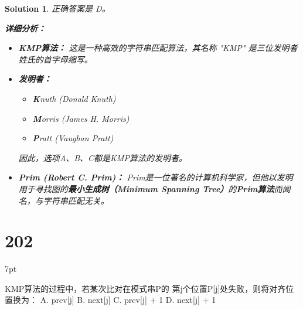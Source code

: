 \documentclass[UTF8]{report}
\newtheorem{solution}{Solution}
\theoremstyle{MyLineTheoremStyle} %
\theoremstyle{MyBlockTheoremStyle} %
\theoremstyle{MySubsubsectionStyle} %
\newenvironment{graybox}{%
        \def\FrameCommand{%
        \hspace{1pt}%
        {\color{gray}\small \vrule width 2pt}%
        {\color{graybox_color}\vrule width 4pt}%
        \colorbox{graybox_color}%
        }%
        \MakeFramed{\advance\hsize-\width\FrameRestore}%
        \noindent\hspace{-4.55pt}%
        \begin{adjustwidth}{}{7pt}%
        \vspace{2pt}\vspace{2pt}%
        }
        {%
        \vspace{2pt}\end{adjustwidth}\endMakeFramed%
        }
\begin{document}
\begin{solution}
正确答案是 D。

\textbf{详细分析：}

\begin{itemize}
    \item \textbf{KMP算法：} 这是一种高效的字符串匹配算法，其名称 "KMP" 是三位发明者姓氏的首字母缩写。
    \item \textbf{发明者：}
    \begin{itemize}
        \item \textbf{K}nuth (Donald Knuth)
        \item \textbf{M}orris (James H. Morris)
        \item \textbf{P}ratt (Vaughan Pratt)
    \end{itemize}
    因此，选项A、B、C都是KMP算法的发明者。

    \item \textbf{Prim (Robert C. Prim)：}
    Prim是一位著名的计算机科学家，但他以发明用于寻找图的\textbf{最小生成树（Minimum Spanning Tree）}的\textbf{Prim算法}而闻名，与字符串匹配无关。
\end{itemize}
\end{solution}


\section*{202}
\begin{graybox}
KMP算法的过程中，若某次比对在模式串P的
第j个位置P[j]处失败，则将对齐位置换为：
A. prev[j]
B. next[j]
C. prev[j] + 1
D. next[j] + 1
\end{graybox}
\end{document}
